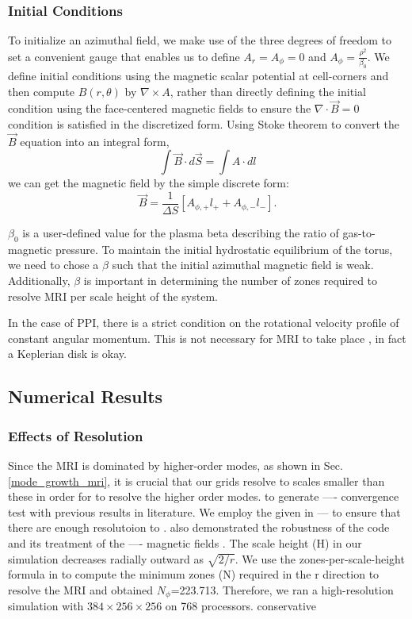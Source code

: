 \documentclass[iop,revtex4]{emulateapj}
\begin{document}
	\subsubsection{Initial Conditions}
	To initialize an azimuthal field, we make use of the three degrees of freedom to set a convenient gauge that enables us to define $A_r = A_\phi = 0$ and $A_\phi = \frac{\rho^2}{\beta_0}$. We define initial conditions using the magnetic scalar potential at cell-corners and then compute $B(r,\theta)$ by $\nabla \times A$, rather than directly defining the initial condition using the face-centered magnetic fields to ensure the $\nabla \cdot \vec{B}=0$ condition is satisfied in the discretized form. Using Stoke theorem to convert the $\vec{B}$ equation into an integral form,
\begin{equation}
\int \vec{B} \cdot d\vec{S}  = \int A\cdot dl 
\end{equation}
we can get the magnetic field by the simple discrete form:
\begin{equation}
\vec{B}=\frac{1}{\Delta S}[A_{\phi,+} l_+ +A_{\phi,-} l_-] .
\end{equation}
	\par $\beta_0$ is a user-defined value for the plasma beta describing the ratio of gas-to-magnetic pressure. To maintain the initial hydrostatic equilibrium of the torus, we need to chose a $\beta$ such that the initial azimuthal magnetic field is weak.
Additionally, $\beta$ is important in determining the number of zones required to resolve MRI per scale height of the system.
\par In the case of \ac{PPI}, there is a strict condition on the rotational velocity profile of constant angular momentum. This is not necessary for \ac{MRI} to take place , in fact a Keplerian disk is okay. 
\subsection{Numerical Results}
\subsubsection{Effects of Resolution}
\par Since the \ac{MRI} is dominated by higher-order modes, as shown in Sec.\ref{mode_growth_mri}, it is crucial that our grids resolve to scales smaller than these in order for to resolve the higher order modes. to generate ---- convergence test with previous results in literature. We employ the 
given in --- to ensure that there are enough resolutoion to .
also demonstrated the robustness of the \app code and its treatment of the ---- magnetic fields . The scale height (H) in our simulation decreases radially outward as $\sqrt{2/r}$. We use the zones-per-scale-height formula in \cite{Hawley:2011A} to compute the minimum zones (N) required in the r direction to resolve the \ac{MRI} and obtained $N_\phi$=223.713. Therefore, we ran a high-resolution simulation with $384\times 256\times 256$ on 768 processors.
conservative 
\end{document}
